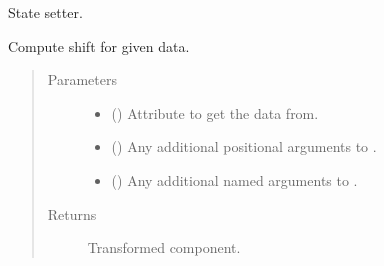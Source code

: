 \documentclass[letterpaper,10pt,english]{sphinxmanual}
\begin{document}
\begin{fulllineitems}
\begin{fulllineitems}
\begin{quote}
\begin{description}
\end{description}\end{quote}

\end{fulllineitems}


\begin{fulllineitems}
\label{\detokenize{api/rock:geology.src.Rock.set_state}}
State setter.

\end{fulllineitems}


\begin{fulllineitems}
\label{\detokenize{api/rock:geology.src.Rock.shift}}
Compute shift for given data.
\begin{quote}\begin{description}
\item[{Parameters}] \leavevmode\begin{itemize}
\item {} 
 (\sphinxstyleliteralemphasis{\sphinxupquote{, }}) \textendash{} Attribute to get the data from.

\item {} 
 () \textendash{} Any additional positional arguments to .

\item {} 
 () \textendash{} Any additional named arguments to .

\end{itemize}

\item[{Returns}] \leavevmode
{} \textendash{} Transformed component.


\end{description}
\end{quote}
\end{fulllineitems}
\end{fulllineitems}
\end{document}
